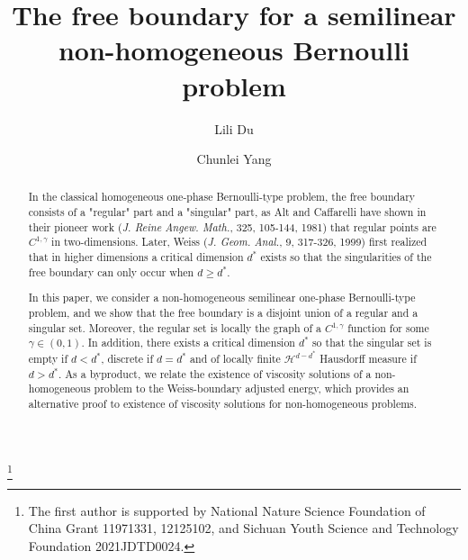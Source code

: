 \documentclass[11pt,reqno]{amsart}
\begin{document}
	\vspace{1cm}
	\title[Semilinear Bernoulli-type problem]{The free boundary for a semilinear non-homogeneous Bernoulli problem}
	\author{Lili Du}
	\address{College of Mathematics and Statistics, Shenzhen University,Shenzhen 518061, P. R. China.}
	\thanks{The first author is supported by National Nature Science Foundation of China Grant 11971331, 12125102, and Sichuan Youth Science and Technology Foundation 2021JDTD0024.}
	\author{Chunlei Yang}
	\address[]{Department of Mathematics, Sichuan University, Chengdu 610064, P. R. China.}
\begin{abstract}
	In the classical homogeneous one-phase Bernoulli-type problem, the free boundary consists of a "regular" part and a "singular" part, as Alt and Caffarelli have shown in their pioneer work (\emph{J. Reine Angew. Math.}, 325, 105-144, 1981) that regular points are $C^{1,\gamma}$ in two-dimensions. Later, Weiss (\emph{J. Geom. Anal.}, 9, 317-326, 1999) first realized that in higher dimensions a critical dimension $d^{*}$ exists so that the singularities of the free boundary can only occur when $d\geqslant d^{*}$. 
	
	In this paper, we consider a non-homogeneous semilinear one-phase Bernoulli-type problem, and we show that the free boundary is a disjoint union of a regular and a singular set. Moreover, the regular set is locally the graph of a $C^{1,\gamma}$ function for some $\gamma\in(0,1)$. In addition, there exists a critical dimension $d^{*}$ so that the singular set is empty if $d<d^{*}$, discrete if $d=d^{*}$ and of locally finite $\mathcal{H}^{d-d^{*}}$ Hausdorff measure if $d>d^{*}$. As a byproduct, we relate the existence of viscosity solutions of a non-homogeneous problem to the Weiss-boundary adjusted energy, which provides an alternative proof to existence of viscosity solutions for non-homogeneous problems.
\end{abstract}
\maketitle
\end{document}
